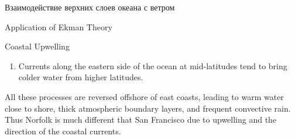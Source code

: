 \begin{chapter}{Взаимодействие верхних слоев океана с ветром}
\begin{section}{Application of Ekman Theory}
\begin{paragraph}{Coastal Upwelling}
\begin{enumerate}
\item
Currents along the eastern side of the ocean at mid-latitudes tend to
bring colder water from higher latitudes.
%
\end{enumerate}
All these processes are reversed offshore of east coasts, leading to
warm water close to shore, thick atmospheric boundary layers, and
frequent convective rain. Thus Norfolk is much different that San
Francisco due to upwelling and the direction
of the coastal currents.
%
\end{paragraph}


\end{section}
\end{chapter}
